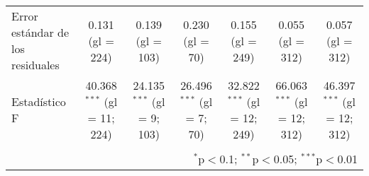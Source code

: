 \documentclass[spanish,11pt]{article}
\begin{document}
\begin{table}[!htbp]
\begin{tabular}{@{\extracolsep{5pt}}lcccccc}
Error estándar de los residuales & 0.131 (gl = 224) & 0.139 (gl = 103) & 0.230 (gl = 70) & 0.155 (gl = 249) & 0.055 (gl = 312) & 0.057 (gl = 312) \\ 
Estadístico F & 40.368$^{***}$ (gl = 11; 224) & 24.135$^{***}$ (gl = 9; 103) & 26.496$^{***}$ (gl = 7; 70) & 32.822$^{***}$ (gl = 12; 249) & 66.063$^{***}$ (gl = 12; 312) & 46.397$^{***}$ (gl = 12; 312) \\ 
\hline 
\hline \\[-1.8ex] 
\multicolumn{7}{r}{$^{*}$p$<$0.1; $^{**}$p$<$0.05; $^{***}$p$<$0.01} \\ 
\end{tabular} 
\end{table} 
\end{document}
